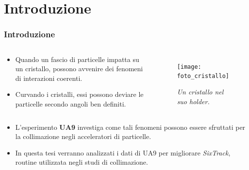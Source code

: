 \documentclass[10pt]{beamer}
\begin{document}
\section{Introduzione}

\begin{frame}
\frametitle{Introduzione}
\begin{columns}[c] %

\vspace*{-0.3cm}%
\begin{block}{}
\begin{itemize}
\item Quando un fascio di particelle impatta su un cristallo,
possono avvenire dei fenomeni di interazioni coerenti.

\item Curvando i cristalli, essi possono deviare le particelle secondo
angoli ben definiti.
\end{itemize}
\end{block}

\begin{figure}
\texttt{[image: foto\_cristallo]}
\caption{ \footnotesize \itshape
Un cristallo nel suo holder.
}
\end{figure}
\end{columns}
\vspace*{-0.9cm}
\begin{columns}[c]
% 
\column{\textwidth}
\begin{block}{}
\begin{itemize}
\item L'esperimento \alert{\textbf{UA9}} investiga come tali fenomeni possono essere sfruttati per la collimazione negli
acceleratori di particelle.

\item In questa tesi verranno analizzati i dati di UA9 per migliorare
\textit{SixTrack}, routine utilizzata negli studi di collimazione.
\end{itemize}
\end{block}

\column{0cm}

\end{columns}
\end{frame}
\end{document}
